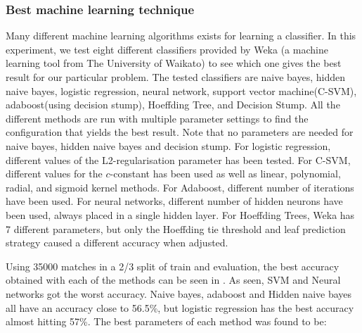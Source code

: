 \subsubsection{Best machine learning technique}
Many different machine learning algorithms exists for learning a classifier. In this experiment, we test eight different classifiers provided by Weka (a machine learning tool from The University of Waikato) to see which one gives the best result for our particular problem. The tested classifiers are naive bayes, hidden naive bayes, logistic regression, neural network, support vector machine(C-SVM), adaboost(using decision stump), Hoeffding Tree, and Decision Stump. All the different methods are run with multiple parameter settings to find the configuration that yields the best result. Note that no parameters are needed for naive bayes, hidden naive bayes and decision stump. For logistic regression, different values of the L2-regularisation parameter has been tested. For C-SVM, different values for the $c$-constant has been used as well as linear, polynomial, radial, and sigmoid kernel methods. For Adaboost, different number of iterations have been used. For neural networks, different number of hidden neurons have been used, always placed in a single hidden layer. For Hoeffding Trees, Weka has 7 different parameters, but only the Hoeffding tie threshold and leaf prediction strategy caused a different accuracy when adjusted.

Using 35000 matches in a 2/3 split of train and evaluation, the best accuracy obtained with each of the methods can be seen in . As seen, SVM and Neural networks got the worst accuracy. Naive bayes, adaboost and Hidden naive bayes all have an accuracy close to 56.5\%, but logistic regression has the best accuracy almost hitting 57\%.
The best parameters of each method was found to be:

